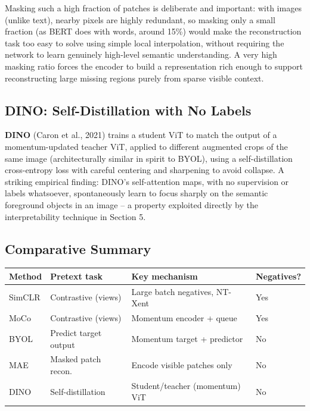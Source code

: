 \documentclass[12pt,a4paper]{article}
\begin{document}
\begin{keyidea}
Masking such a high fraction of patches is deliberate and important: with images (unlike text), nearby pixels are highly redundant, so masking only a small fraction (as BERT does with words, around 15\%) would make the reconstruction task too easy to solve using simple local interpolation, without requiring the network to learn genuinely high-level semantic understanding. A very high masking ratio forces the encoder to build a representation rich enough to support reconstructing large missing regions purely from sparse visible context.
\end{keyidea}

\subsection{DINO: Self-Distillation with No Labels}

\textbf{DINO} (Caron et al., 2021) trains a student ViT to match the output of a momentum-updated teacher ViT, applied to different augmented crops of the same image (architecturally similar in spirit to BYOL), using a self-distillation cross-entropy loss with careful centering and sharpening to avoid collapse. A striking empirical finding: DINO's self-attention maps, with no supervision or labels whatsoever, spontaneously learn to focus sharply on the semantic foreground objects in an image -- a property exploited directly by the interpretability technique in Section 5.

\subsection{Comparative Summary}

\begin{center}
\renewcommand{\arraystretch}{1.3}
\begin{tabular}{|l|p{3.2cm}|p{4.0cm}|p{2.2cm}|}
\hline
\textbf{Method} & \textbf{Pretext task} & \textbf{Key mechanism} & \textbf{Negatives?} \\
\hline
SimCLR & Contrastive (views) & Large batch negatives, NT-Xent & Yes \\
MoCo & Contrastive (views) & Momentum encoder + queue & Yes \\
BYOL & Predict target output & Momentum target + predictor & No \\
MAE & Masked patch recon. & Encode visible patches only & No \\
DINO & Self-distillation & Student/teacher (momentum) ViT & No \\
\hline
\end{tabular}
\end{center}
\end{document}
